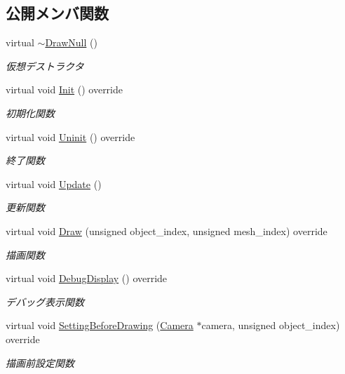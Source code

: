 \subsection*{公開メンバ関数}
\begin{DoxyCompactItemize}
\item 
virtual \mbox{\hyperlink{class_draw_null_aa085e175e9e05fc56cb4aefa2d07f371}{$\sim$\+Draw\+Null}} ()
\begin{DoxyCompactList}\small\item\em 仮想デストラクタ \end{DoxyCompactList}\item 
virtual void \mbox{\hyperlink{class_draw_null_acd7fef3ccea1da537ac9507ffbb6dd2e}{Init}} () override
\begin{DoxyCompactList}\small\item\em 初期化関数 \end{DoxyCompactList}\item 
virtual void \mbox{\hyperlink{class_draw_null_a12d44e341c7364b5ab9cdd661dc16187}{Uninit}} () override
\begin{DoxyCompactList}\small\item\em 終了関数 \end{DoxyCompactList}\item 
virtual void \mbox{\hyperlink{class_draw_null_a0149bcf84a34b138642ab7975ae46f30}{Update}} ()
\begin{DoxyCompactList}\small\item\em 更新関数 \end{DoxyCompactList}\item 
virtual void \mbox{\hyperlink{class_draw_null_afe50f6fd820b18d673f70f048743f339}{Draw}} (unsigned object\+\_\+index, unsigned mesh\+\_\+index) override
\begin{DoxyCompactList}\small\item\em 描画関数 \end{DoxyCompactList}\item 
virtual void \mbox{\hyperlink{class_draw_null_aa78d05c51ff3943888678b9b2c6bd027}{Debug\+Display}} () override
\begin{DoxyCompactList}\small\item\em デバッグ表示関数 \end{DoxyCompactList}\item 
virtual void \mbox{\hyperlink{class_draw_null_a7f0d52c5c2fb2d9b8eb423f363862290}{Setting\+Before\+Drawing}} (\mbox{\hyperlink{class_camera}{Camera}} $\ast$camera, unsigned object\+\_\+index) override
\begin{DoxyCompactList}\small\item\em 描画前設定関数 \end{DoxyCompactList}\item 

\end{DoxyCompactItemize}
